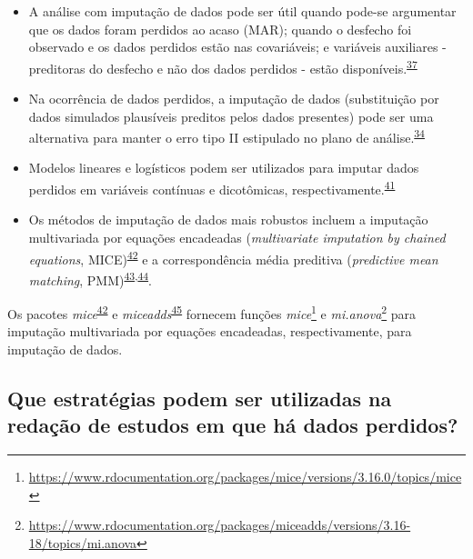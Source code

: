 \documentclass[
  a4paper,
]{book}
\renewcommand{\href}[2]{#2\footnote{\url{#1}}}
\newenvironment{infobox}[1]
  {
  \begin{itemize}
  \renewcommand{\labelitemi}{
    \raisebox{-.7\height}[0pt][0pt]{
      {\setkeys{Gin}{width=3em,keepaspectratio}
        \texttt{[image: \#1]}}
    }
  }
  \setlength{\fboxsep}{1em}
  \begin{blackbox}
  \item
  }
  {
  \end{blackbox}
  \end{itemize}
  }
\begin{document}
\begin{itemize}
\item
  A análise com imputação de dados pode ser útil quando pode-se argumentar que os dados foram perdidos ao acaso (MAR); quando o desfecho foi observado e os dados perdidos estão nas covariáveis; e variáveis auxiliares - preditoras do desfecho e não dos dados perdidos - estão disponíveis.\textsuperscript{\protect\hyperlink{ref-carpenter2021}{37}}
\item
  Na ocorrência de dados perdidos, a imputação de dados (substituição por dados simulados plausíveis preditos pelos dados presentes) pode ser uma alternativa para manter o erro tipo II estipulado no plano de análise.\textsuperscript{\protect\hyperlink{ref-Altman2007}{34}}
\item
  Modelos lineares e logísticos podem ser utilizados para imputar dados perdidos em variáveis contínuas e dicotômicas, respectivamente.\textsuperscript{\protect\hyperlink{ref-austin2023}{41}}
\item
  Os métodos de imputação de dados mais robustos incluem a imputação multivariada por equações encadeadas (\emph{multivariate imputation by chained equations}, MICE)\textsuperscript{\protect\hyperlink{ref-mice}{42}} e a correspondência média preditiva (\emph{predictive mean matching}, PMM)\textsuperscript{\protect\hyperlink{ref-rubin1986}{43},\protect\hyperlink{ref-little1988a}{44}}.
\end{itemize}

\begin{infobox}{images/Rlogo}
Os pacotes \emph{mice}\textsuperscript{\protect\hyperlink{ref-mice}{42}} e \emph{miceadds}\textsuperscript{\protect\hyperlink{ref-miceadds}{45}} fornecem funções \href{https://www.rdocumentation.org/packages/mice/versions/3.16.0/topics/mice}{\emph{mice}} e \href{https://www.rdocumentation.org/packages/miceadds/versions/3.16-18/topics/mi.anova}{\emph{mi.anova}} para imputação multivariada por equações encadeadas, respectivamente, para imputação de dados.

\end{infobox}

\hypertarget{que-estratuxe9gias-podem-ser-utilizadas-na-redauxe7uxe3o-de-estudos-em-que-huxe1-dados-perdidos}{%
\subsection{Que estratégias podem ser utilizadas na redação de estudos em que há dados perdidos?}\label{que-estratuxe9gias-podem-ser-utilizadas-na-redauxe7uxe3o-de-estudos-em-que-huxe1-dados-perdidos}}
\end{document}
